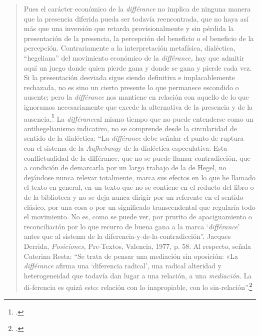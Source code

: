 \begin{quote}
Pues el carácter económico de la \emph{différance} no implica de ninguna manera que la presencia diferida pueda ser todavía reencontrada, que no haya así más que una inversión que retarda provisionalmente y sin pérdida la presentación de la presencia, la percepción del beneficio o el beneficio de la percepción. Contrariamente a la interpretación metafísica, dialéctica, \enquote{hegeliana} del movimiento económico de la \emph{différance,} hay que admitir aquí un juego donde quien pierde gana y donde se gana y pierde cada vez. Si la presentación desviada sigue siendo definitiva e implacablemente rechazada, no es sino un cierto presente lo que permanece escondido o ausente; pero la \emph{différance} nos mantiene en relación con aquello de lo que ignoramos necesariamente que excede la alternativa de la presencia y de la ausencia.\footcite[21]{@6980-DERRIDA1989} La \emph{différance}al mismo tiempo que no puede entenderse como un antihegelianismo indicativo, no se comprende desde la circularidad de sentido de la dialéctica: \enquote{La \emph{différance} debe señalar el punto de ruptura con el sistema de la \emph{Aufhebung}y de la dialéctica especulativa. Esta conflictualidad de la différance, que no se puede llamar contradicción, que a condición de demarcarla por un largo trabajo de la de Hegel, no dejándose nunca relevar totalmente, marca sus efectos en lo que he llamado el texto en general, en un texto que no se contiene en el reducto del libro o de la biblioteca y no se deja nunca dirigir por un referente en el sentido clásico, por una cosa o por un significado transcendental que regularía todo el movimiento. No es, como se puede ver, por prurito de apaciguamiento o reconciliación por lo que recurro de buena gana a la marca \enquote{\emph{différance}} antes que al sistema de la diferencia-y-de-la-contradicción}. Jacques Derrida, \emph{Posiciones,} Pre-Textos, Valencia, 1977, p. 58. Al respecto, señala Caterina Resta: \enquote{Se trata de pensar una mediación sin oposición: «La \emph{différance} afirma una \enquote{diferencia radical}, una radical alteridad y heterogeneidad que todavía dan lugar a una relación, a una \emph{mediación}. La di-ferencia es quizá esto: relación con lo inapropiable, con lo sin-relación}.\footcite[123]{@6981-RESTA1990}
\end{quote}

